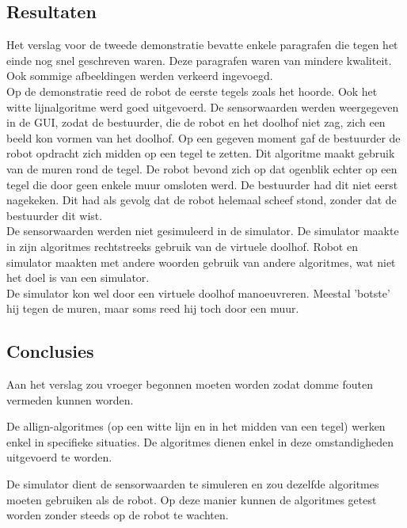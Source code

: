 \documentclass[tt3]{penoverslag}
\begin{document}
\subsection{Resultaten} %
\label{Assec:result2}
Het verslag voor de tweede demonstratie bevatte enkele paragrafen die tegen het einde nog snel geschreven waren. Deze paragrafen waren van mindere kwaliteit. Ook sommige afbeeldingen werden verkeerd ingevoegd.\\

Op de demonstratie reed de robot de eerste tegels zoals het hoorde. Ook het witte lijnalgoritme werd goed uitgevoerd. De sensorwaarden werden weergegeven in de GUI, zodat de bestuurder, die de robot en het doolhof niet zag, zich een beeld kon vormen van het doolhof. Op een gegeven moment gaf de bestuurder de robot opdracht zich midden op een tegel te zetten. Dit algoritme maakt gebruik van de muren rond de tegel. De robot bevond zich op dat ogenblik echter op een tegel die door geen enkele muur omsloten werd. De bestuurder had dit niet eerst nagekeken. Dit had als gevolg dat de robot helemaal scheef stond, zonder dat de bestuurder dit wist.\\

De sensorwaarden werden niet gesimuleerd in de simulator. De simulator maakte in zijn algoritmes rechtstreeks gebruik van de virtuele doolhof. Robot en simulator maakten met andere woorden gebruik van andere algoritmes, wat niet het doel is van een simulator.\\

De simulator kon wel door een virtuele doolhof manoeuvreren. Meestal 'botste' hij tegen de muren, maar soms reed hij toch door een muur.


\subsection{Conclusies} %
\label{Assec:conc2}
Aan het verslag zou vroeger begonnen moeten worden zodat domme fouten vermeden kunnen worden.

De allign-algoritmes (op een witte lijn en in het midden van een tegel) werken enkel in specifieke situaties. De algoritmes dienen enkel in deze omstandigheden uitgevoerd te worden.

De simulator dient de sensorwaarden te simuleren en zou dezelfde algoritmes moeten gebruiken als de robot. Op deze manier kunnen de algoritmes getest worden zonder steeds op de robot te wachten.
\end{document}
